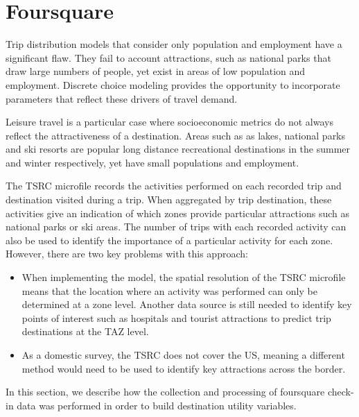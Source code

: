 \section{Foursquare}
\label{section:data-foursquare}
\label{section:foursquare}
Trip distribution models that consider only population and employment have a significant flaw. They fail to account attractions, such as national parks that draw large numbers of people, yet exist in areas of low population and employment. Discrete choice modeling provides the opportunity to incorporate parameters that reflect these drivers of travel demand. 
	
Leisure travel is a particular case where socioeconomic metrics do not always reflect the attractiveness of a destination. Areas such as as lakes, national parks and ski resorts are popular long distance recreational destinations in the summer and winter respectively, yet have small populations and employment. 
	
The TSRC microfile records the activities performed on each recorded trip and destination visited during a trip. When aggregated by trip destination, these activities give an indication of which zones provide particular attractions such as national parks or ski areas. The number of trips with each recorded activity can also be used to identify the importance of a particular activity for each zone. However, there are two key problems with this approach:

\begin{itemize}
\item When implementing the model, the spatial resolution of the TSRC microfile means that the location where an activity was performed can only be determined at a zone level. Another data source is still needed to identify key points of interest such as hospitals and tourist attractions to predict trip destinations at the TAZ level.
\item As a domestic survey, the TSRC does not cover the US, meaning a different method would need to be used to identify key attractions across the border.
\end{itemize}	
In this section, we describe how the collection and processing of foursquare check-in data was performed in order to build destination utility variables.

